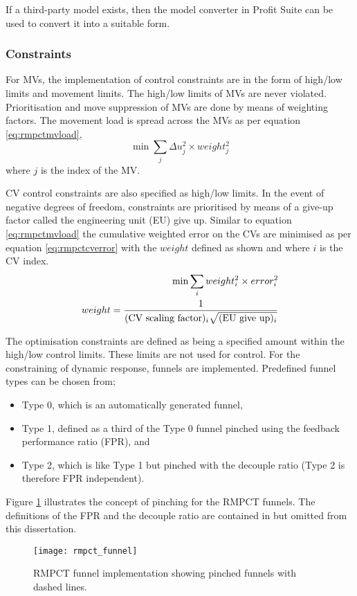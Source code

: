 If a third-party model exists, then the model converter in Profit Suite can be used to convert it into a suitable form.
  
\subsubsection{Constraints}
For MVs, the implementation of control constraints are in the form of high/low limits and movement limits.
The high/low limits of MVs are never violated.
Prioritisation and move suppression of MVs are done by means of weighting factors.
The movement load is spread across the MVs as per equation \ref{eq:rmpctmvload},
\begin{equation}
  \label{eq:rmpctmvload}
  \min \sum_j \Delta u_j^2 \times weight_j^2
\end{equation}
where $j$ is the index of the MV.

CV control constraints are also specified as high/low limits.
In the event of negative degrees of freedom, constraints are prioritised by means of a give-up factor called the engineering unit (EU) give up.
Similar to equation \ref{eq:rmpctmvload} the cumulative weighted error on the CVs are minimised as per equation \ref{eq:rmpctcverror} with the $weight$ defined as shown and where $i$ is the CV index.
\begin{align}
  \label{eq:rmpctcverror}
  \min \sum_i weight_i^2 \times error_i^2 \\
  weight = \frac{1}{(\text{CV scaling factor})_i\sqrt{(\text{EU give up})_i}} \notag
\end{align}

The optimisation constraints are defined as being a specified amount within the high/low control limits.
These limits are not used for control.
For the constraining of dynamic response, funnels are implemented.
Predefined funnel types can be chosen from;
\begin{itemize}
\item Type 0, which is an automatically generated funnel,
\item Type 1, defined as a third of the Type 0 funnel pinched using the feedback performance ratio (FPR), and
\item Type 2, which is like Type 1 but pinched with the decouple ratio (Type 2 is therefore FPR independent).
\end{itemize}
Figure \ref{fig:rmpctfunnel} illustrates the concept of pinching for the RMPCT funnels.
The definitions of the FPR and the decouple ratio are contained in \citet{honeywell1} but omitted from this dissertation.
\begin{figure}[htbp]
  \centering
  \texttt{[image: rmpct\_funnel]}
  \caption[RMPCT funnel implementation]{RMPCT funnel implementation showing pinched funnels with dashed lines.}
  \label{fig:rmpctfunnel}
\end{figure}

